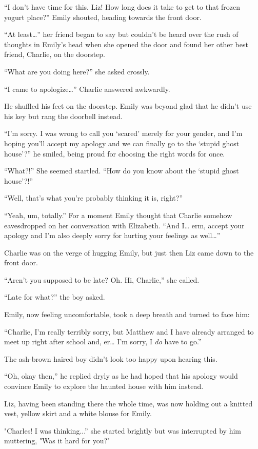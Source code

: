 “I don’t have time for this. Liz! How long does it take to get to that frozen yogurt place?” Emily shouted, heading towards the front door.

“At least…” her friend began to say but couldn’t be heard over the rush of thoughts in Emily’s head when she opened the door and found her other best friend, Charlie, on the doorstep.

“What are you doing here?” she asked crossly.

“I came to apologize…” Charlie answered awkwardly.

He shuffled his feet on the doorstep. Emily was beyond glad that he didn’t use his key but rang the doorbell instead.

“I’m sorry. I was wrong to call you ‘scared’ merely for your gender, and I’m hoping you’ll accept my apology and we can finally go to the ‘stupid ghost house’?” he smiled, being proud for choosing the right words for once.

“What?!” She seemed startled. “How do you know about the ‘stupid ghost house’?!”

“Well, that’s what you’re probably thinking it is, right?”

“Yeah, um, totally.” For a moment Emily thought that Charlie somehow eavesdropped on her conversation with Elizabeth. “And I… erm, accept your apology and I’m also deeply sorry for hurting your feelings as well…”

Charlie was on the verge of hugging Emily, but just then Liz came down to the front door.

“Aren’t you supposed to be late? Oh. Hi, Charlie,” she called.

“Late for what?” the boy asked.

Emily, now feeling uncomfortable, took a deep breath and turned to face him:

“Charlie, I’m really terribly sorry, but Matthew and I have already arranged to meet up right after school and, er… I’m sorry, I \textit{do} have to go.”

The ash-brown haired boy didn’t look too happy upon hearing this.

“Oh, okay then,” he replied dryly as he had hoped that his apology would convince Emily to explore the haunted house with him instead.

Liz, having been standing there the whole time, was now holding out a knitted vest, yellow skirt and a white blouse for Emily.

"Charles! I was thinking...” she started brightly but was interrupted by him muttering, "Was it hard for you?"

